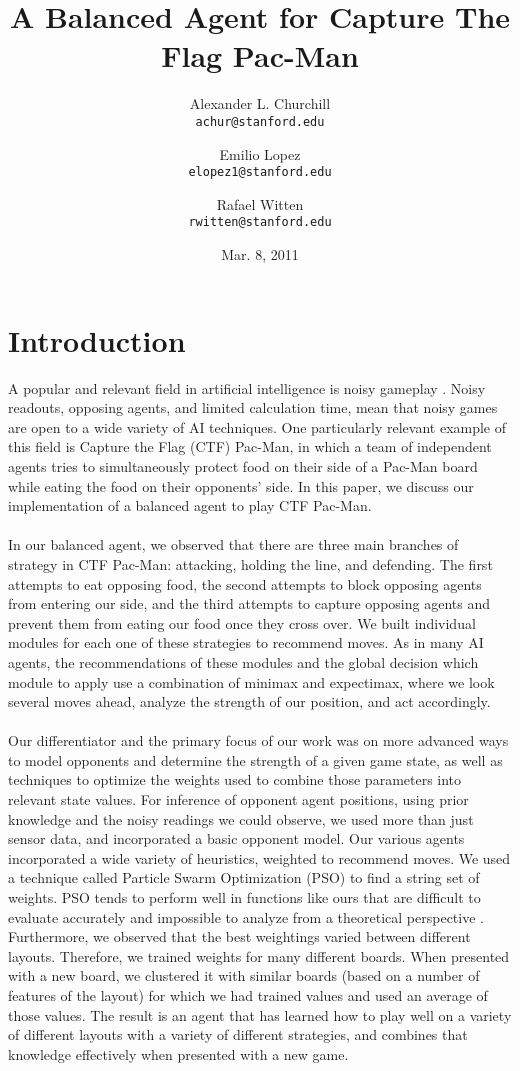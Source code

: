 \documentclass[12pt]{article}
\title{A Balanced Agent for Capture The Flag Pac-Man}
\author{
Alexander L. Churchill\\
\small \texttt{achur@stanford.edu}\\
\and
Emilio Lopez\\
\small \texttt{elopez1@stanford.edu}\\
\and
Rafael Witten\\
\small \texttt{rwitten@stanford.edu}
}
\date{Mar. 8, 2011}
\begin{document}
\maketitle
\section{Introduction}
A popular and relevant field in artificial intelligence is noisy gameplay
\cite{miik}.  Noisy readouts, opposing agents, and limited calculation
time, mean that noisy games are open to a wide variety of AI techniques.
One particularly relevant example of this field is Capture the Flag (CTF)
Pac-Man, in which a team of independent agents tries to simultaneously
protect food on their side of a Pac-Man board while eating the food on
their opponents' side.  In this paper, we discuss our implementation of a
balanced agent to play CTF Pac-Man.
\\ \\
In our balanced agent, we observed that there are three main branches of
strategy in CTF Pac-Man: attacking, holding the line, and defending.  The
first attempts to eat opposing food, the second attempts to block opposing
agents from entering our side, and the third attempts to capture opposing
agents and prevent them from eating our food once they cross over.  We
built individual modules for each one of these strategies to recommend
moves.  As in many AI agents, the recommendations of these modules and the
global decision which module to apply use a combination of minimax and
expectimax, where we look several moves ahead, analyze the strength of our
position, and act accordingly.
\\ \\
Our differentiator and the primary focus of our work was on more advanced
ways to model opponents and determine the strength of a given game state,
as well as techniques to optimize the weights used to combine those
parameters into relevant state values.  For inference of opponent agent
positions, using prior knowledge and the noisy readings we could observe,
we used more than just sensor data, and incorporated a basic opponent
model.  Our various agents incorporated a wide variety of heuristics,
weighted to recommend moves.  We used a technique called Particle Swarm
Optimization (PSO) to find a string set of weights.  PSO tends to perform
well in functions like ours that are difficult to evaluate accurately and
impossible to analyze from a theoretical perspective \cite{carlisle}.
Furthermore, we observed that the best weightings varied between different
layouts.  Therefore, we trained weights for many different boards.  When
presented with a new board, we clustered it with similar boards (based on
a number of features of the layout) for which
we had trained values and used an average of those values.  The result is
an agent that has learned how to play well on a variety of different
layouts with a variety of different strategies, and combines that
knowledge effectively when presented with a new game.
\end{document}
